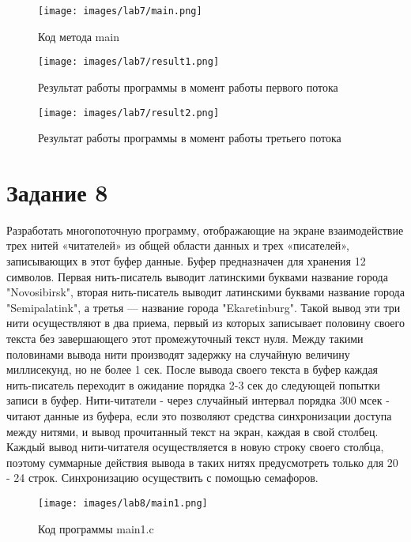 \documentclass[14pt, a4paper]{article}
\begin{document}
    \begin{figure}[H]
        \centering
        \texttt{[image: images/lab7/main.png]}
        \caption{Код метода main}
    \end{figure}

    \begin{figure}[H]
        \centering
        \texttt{[image: images/lab7/result1.png]}
        \caption{Результат работы программы в момент работы первого потока}
    \end{figure}

    \begin{figure}[H]
        \centering
        \texttt{[image: images/lab7/result2.png]}
        \caption{Результат работы программы в момент работы третьего потока}
    \end{figure}

    \newpage

    \section*{Задание 8}

    Разработать многопоточную программу, отображающие на экране взаимодействие трех нитей «читателей» из общей области данных и трех «писателей», записывающих в этот буфер данные. Буфер предназначен для хранения 12 символов. Первая нить-писатель выводит латинскими буквами название города "Novosibirsk", вторая нить-писатель выводит латинскими буквами название города "Semipalatink", а третья — название города "Ekaretinburg". Такой вывод эти три нити осуществляют в два приема, первый из которых записывает половину своего текста без завершающего этот промежуточный текст нуля. Между такими половинами вывода нити производят задержку на случайную величину миллисекунд, но не более 1 сек. После вывода своего текста в буфер каждая нить-писатель переходит в ожидание порядка 2-3 сек до следующей попытки записи в буфер. Нити-читатели - через случайный интервал порядка 300 мсек - читают данные из буфера, если это позволяют средства синхронизации доступа между нитями, и вывод прочитанный текст на экран, каждая в свой столбец. Каждый вывод нити-читателя осуществляется в новую строку своего столбца, поэтому суммарные действия вывода в таких нитях предусмотреть только для 20 - 24 строк. Синхронизацию осуществить с помощью семафоров.

    \begin{figure}[H]
        \centering
        \texttt{[image: images/lab8/main1.png]}
        \caption{Код программы main1.c}
    \end{figure}
\end{document}
